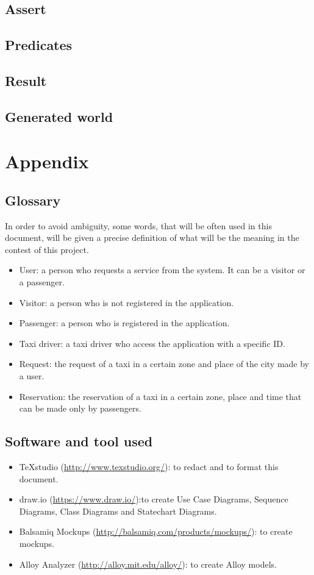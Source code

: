 \documentclass[18pt,oneside,a4paper, titlepage]{article}
\begin{document}
	\subsection{Assert}
	\subsection{Predicates}
	\subsection{Result}
	\subsection{Generated world}

\newpage
\section{Appendix}
	\subsection{Glossary}
		In order to avoid ambiguity, some words, that will be often used in this document, will be given a precise definition of what will be the meaning in the contest of this project.
		\begin{itemize}
			\item User: a person who requests a service from the system. It can be a visitor or a passenger.
			\item Visitor: a person who is not registered in the application.
			\item Passenger: a person who is registered in the application.
			\item Taxi driver: a taxi driver who access the application with a specific ID.
			\item Request: the request of a taxi in a certain zone and place of the city made by a user.
			\item Reservation: the reservation of a taxi in a certain zone, place and time that can be made only by passengers.
	\end{itemize}
	\subsection{Software and tool used}
		\begin{itemize}
			\item TeXstudio (\url{http://www.texstudio.org/}): to redact and to format this document.
			\item draw.io (\url{https://www.draw.io/}):to create Use Case Diagrams, Sequence Diagrams, Class Diagrams and Statechart Diagrams.
			\item Balsamiq Mockups (\url{http://balsamiq.com/products/mockups/}): to create mockups.
			\item Alloy Analyzer (\url{http://alloy.mit.edu/alloy/}): to create Alloy models.
		\end{itemize}
	
\end{document}
